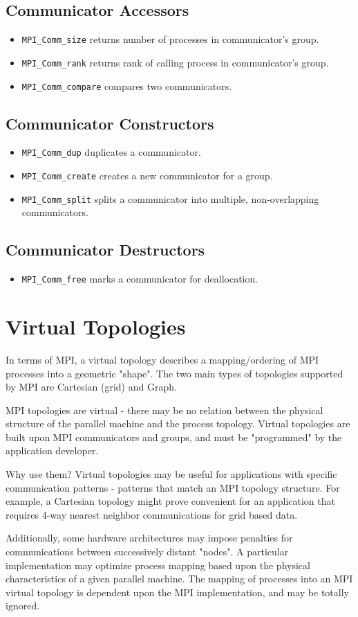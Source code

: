 \subsection{Communicator Accessors}
\begin{itemize}
\item\texttt{MPI\_Comm\_size} returns number of processes in communicator's group.
\item\texttt{MPI\_Comm\_rank} returns rank of calling process in communicator's group.
\item\texttt{MPI\_Comm\_compare} compares two communicators.
\end{itemize}

\subsection{Communicator Constructors}
\begin{itemize}
\item\texttt{MPI\_Comm\_dup} duplicates a communicator.
\item\texttt{MPI\_Comm\_create} creates a new communicator for a group.
\item\texttt{MPI\_Comm\_split} splits a communicator into multiple, non-overlapping communicators.
\end{itemize}

\subsection{Communicator Destructors}
\begin{itemize}
\item\texttt{MPI\_Comm\_free} marks a communicator for deallocation.
\end{itemize}

\section{Virtual Topologies}
In terms of MPI, a virtual topology describes a mapping/ordering of MPI processes 
into a geometric "shape".  The two main types of topologies supported by MPI are Cartesian (grid) and 
Graph.  

MPI topologies are virtual - there may be no relation between the physical 
structure of the parallel machine and the process topology. Virtual topologies are built upon MPI communicators and groups, and must be "programmed" by the application developer.  

Why use them? Virtual topologies may be useful for applications with specific communication patterns - 
patterns that match an MPI topology structure.  For example, a Cartesian topology might prove convenient for an application that requires 4-way nearest neighbor communications for grid based data.  

Additionally, some hardware architectures may impose penalties for communications between 
successively distant "nodes".  A particular implementation may optimize process mapping based upon the physical characteristics of a given parallel machine.  The mapping of processes into an MPI virtual topology is dependent upon the MPI implementation, and may be totally ignored.
